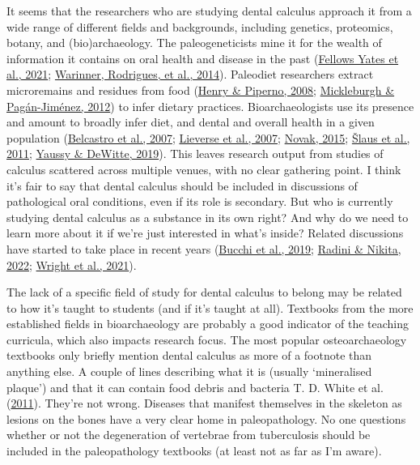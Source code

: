 \documentclass[
  letterpaper,
]{book}
\begin{document}
It seems that the researchers who are studying dental calculus approach
it from a wide range of different fields and backgrounds, including
genetics, proteomics, botany, and (bio)archaeology. The paleogeneticists
mine it for the wealth of information it contains on oral health and
disease in the past
(\protect\hyperlink{ref-yatesOralMicrobiome2021}{Fellows Yates et al.,
2021}; \protect\hyperlink{ref-warinnerPathogensHost2014}{Warinner,
Rodrigues, et al., 2014}). Paleodiet researchers extract microremains
and residues from food
(\protect\hyperlink{ref-henryCalculusSyria2008}{Henry \& Piperno, 2008};
\protect\hyperlink{ref-mickleburghNewInsights2012}{Mickleburgh \&
Pagán-Jiménez, 2012}) to infer dietary practices. Bioarchaeologists use
its presence and amount to broadly infer diet, and dental and overall
health in a given population
(\protect\hyperlink{ref-belcastroContinuityDiscontinuity2007}{Belcastro
et al., 2007}; \protect\hyperlink{ref-lieverseDentalHealth2007}{Lieverse
et al., 2007}; \protect\hyperlink{ref-novakDentalHealth2015}{Novak,
2015}; \protect\hyperlink{ref-slausDentalHealth2011}{Šlaus et al.,
2011}; \protect\hyperlink{ref-yaussyCalculusSurvivorship2019}{Yaussy \&
DeWitte, 2019}). This leaves research output from studies of calculus
scattered across multiple venues, with no clear gathering point. I think
it's fair to say that dental calculus should be included in discussions
of pathological oral conditions, even if its role is secondary. But who
is currently studying dental calculus as a substance in its own right?
And why do we need to learn more about it if we're just interested in
what's inside? Related discussions have started to take place in recent
years (\protect\hyperlink{ref-bucchiComparisonsMethods2019}{Bucchi et
al., 2019}; \protect\hyperlink{ref-radiniDirtyTeeth2022}{Radini \&
Nikita, 2022};
\protect\hyperlink{ref-wrightAdvancingRefining2021}{Wright et al.,
2021}).

The lack of a specific field of study for dental calculus to belong may
be related to how it's taught to students (and if it's taught at all).
Textbooks from the more established fields in bioarchaeology are
probably a good indicator of the teaching curricula, which also impacts
research focus. The most popular osteoarchaeology textbooks only briefly
mention dental calculus as more of a footnote than anything else. A
couple of lines describing what it is (usually `mineralised plaque') and
that it can contain food debris and bacteria T. D. White et al.
(\protect\hyperlink{ref-whiteHumanOsteology2011}{2011}). They're not
wrong. Diseases that manifest themselves in the skeleton as lesions on
the bones have a very clear home in paleopathology. No one questions
whether or not the degeneration of vertebrae from tuberculosis should be
included in the paleopathology textbooks (at least not as far as I'm
aware).
\end{document}
